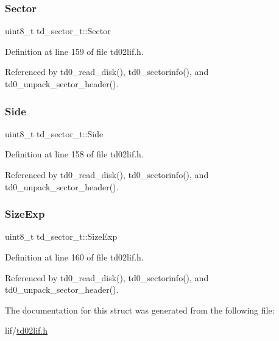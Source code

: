 \subsubsection{\texorpdfstring{Sector}{Sector}}
{\footnotesize\ttfamily uint8\+\_\+t td\+\_\+sector\+\_\+t\+::\+Sector}



Definition at line 159 of file td02lif.\+h.



Referenced by td0\+\_\+read\+\_\+disk(), td0\+\_\+sectorinfo(), and td0\+\_\+unpack\+\_\+sector\+\_\+header().

\mbox{\label{structtd__sector__t_ae8f05b8d6e903e618f6adec8973221f7}} 
\subsubsection{\texorpdfstring{Side}{Side}}
{\footnotesize\ttfamily uint8\+\_\+t td\+\_\+sector\+\_\+t\+::\+Side}



Definition at line 158 of file td02lif.\+h.



Referenced by td0\+\_\+read\+\_\+disk(), td0\+\_\+sectorinfo(), and td0\+\_\+unpack\+\_\+sector\+\_\+header().

\mbox{\label{structtd__sector__t_addc6d434740a76aebde544a9beab1b6b}} 
\subsubsection{\texorpdfstring{Size\+Exp}{SizeExp}}
{\footnotesize\ttfamily uint8\+\_\+t td\+\_\+sector\+\_\+t\+::\+Size\+Exp}



Definition at line 160 of file td02lif.\+h.



Referenced by td0\+\_\+read\+\_\+disk(), td0\+\_\+sectorinfo(), and td0\+\_\+unpack\+\_\+sector\+\_\+header().



The documentation for this struct was generated from the following file\+:\begin{DoxyCompactItemize}
\item 
lif/\hyperlink{td02lif_8h}{td02lif.\+h}\end{DoxyCompactItemize}
